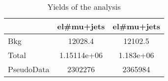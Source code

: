 \documentclass[10pt]{article}
\begin{document}
\begin{table}[htbp]
\begin{center}
\begin{tabular}{|l|S|S|}
\hline 
 & {el#mu+jets} & {el#mu+jets}\\
\hline 
  Bkg   & 12028.4  & 12102.5  \\ 
\hline 
  Total  & 1.15114e+06  & 1.183e+06  \\ 
\hline 
  PseudoData   & 2302276 & 2365984 \\ 
\hline 
\end{tabular} 
\caption{Yields of the analysis} 
\end{center} 
\end{table} 
\end{document}
